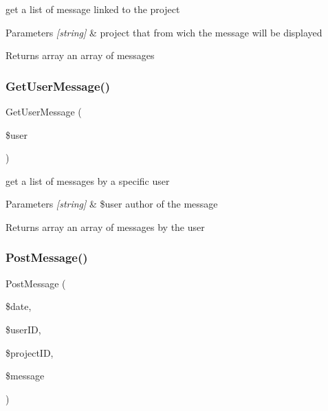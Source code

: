get a list of message linked to the project 


\begin{DoxyParams}{Parameters}
{\em \mbox{[}string\mbox{]}} & project that from wich the message will be displayed\\
\hline
\end{DoxyParams}
\begin{DoxyReturn}{Returns}
array an array of messages 
\end{DoxyReturn}
\mbox{\label{class_forum_d_a_o_a641bb747b67128db836bf231ece2ae74}} 
\subsubsection{\texorpdfstring{Get\+User\+Message()}{GetUserMessage()}}
{\footnotesize\ttfamily Get\+User\+Message (\begin{DoxyParamCaption}\item[{}]{\$user }\end{DoxyParamCaption})}



get a list of messages by a specific user 


\begin{DoxyParams}{Parameters}
{\em \mbox{[}string\mbox{]}} & \$user author of the message\\
\hline
\end{DoxyParams}
\begin{DoxyReturn}{Returns}
array an array of messages by the user 
\end{DoxyReturn}
\mbox{\label{class_forum_d_a_o_ac06809a2f0001b1ad909bebba40aefef}} 
\subsubsection{\texorpdfstring{Post\+Message()}{PostMessage()}}
{\footnotesize\ttfamily Post\+Message (\begin{DoxyParamCaption}\item[{}]{\$date,  }\item[{}]{\$user\+ID,  }\item[{}]{\$project\+ID,  }\item[{}]{\$message }\end{DoxyParamCaption})}



